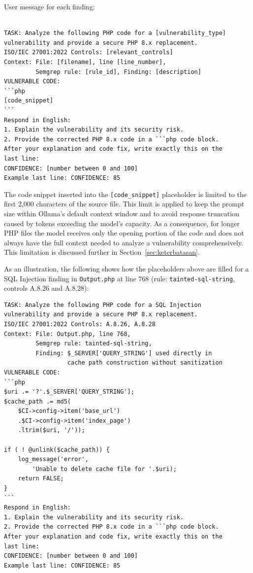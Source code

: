 User message for each finding:

\begin{lstlisting}[style=promptstyle]

TASK: Analyze the following PHP code for a [vulnerability_type]
vulnerability and provide a secure PHP 8.x replacement.
ISO/IEC 27001:2022 Controls: [relevant_controls]
Context: File: [filename], line [line_number],
         Semgrep rule: [rule_id], Finding: [description]
VULNERABLE CODE:
```php
[code_snippet]
```
Respond in English:
1. Explain the vulnerability and its security risk.
2. Provide the corrected PHP 8.x code in a ```php code block.
After your explanation and code fix, write exactly this on the
last line:
CONFIDENCE: [number between 0 and 100]
Example last line: CONFIDENCE: 85
\end{lstlisting}

The code snippet inserted into the \texttt{[code\_snippet]} placeholder is limited to the first 2,000 characters of the source file. This limit is applied to keep the prompt size within Ollama's default context window and to avoid response truncation caused by tokens exceeding the model's capacity. As a consequence, for longer PHP files the model receives only the opening portion of the code and does not always have the full context needed to analyze a vulnerability comprehensively. This limitation is discussed further in Section~\ref{sec:keterbatasan}.

As an illustration, the following shows how the placeholders above are filled for a SQL Injection finding in \texttt{Output.php} at line 768 (rule: \texttt{tainted-sql-string}, controls A.8.26 and A.8.28):

\newpage
\begin{lstlisting}[style=promptstyle]
TASK: Analyze the following PHP code for a SQL Injection
vulnerability and provide a secure PHP 8.x replacement.
ISO/IEC 27001:2022 Controls: A.8.26, A.8.28
Context: File: Output.php, line 768,
         Semgrep rule: tainted-sql-string,
         Finding: $_SERVER['QUERY_STRING'] used directly in
                  cache path construction without sanitization
VULNERABLE CODE:
```php
$uri .= '?'.$_SERVER['QUERY_STRING'];
$cache_path .= md5(
    $CI->config->item('base_url')
    .$CI->config->item('index_page')
    .ltrim($uri, '/'));

if ( ! @unlink($cache_path)) {
    log_message('error',
        'Unable to delete cache file for '.$uri);
    return FALSE;
}
```
Respond in English:
1. Explain the vulnerability and its security risk.
2. Provide the corrected PHP 8.x code in a ```php code block.
After your explanation and code fix, write exactly this on the
last line:
CONFIDENCE: [number between 0 and 100]
Example last line: CONFIDENCE: 85
\end{lstlisting}

